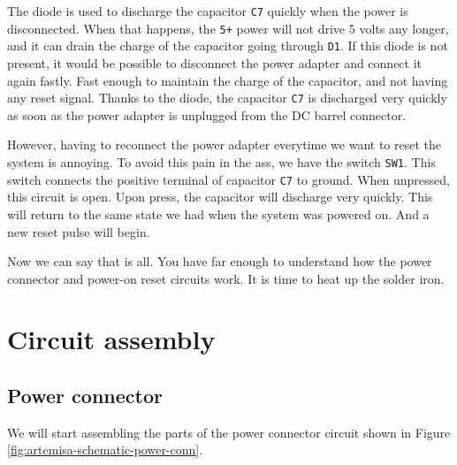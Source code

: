 The diode is used to discharge the capacitor {\tt C7} quickly when the power is disconnected. When that happens, the {\tt 5+} power will not drive 5 volts any longer, and it can drain the charge of the capacitor going through {\tt D1}. If this diode is not present, it would be possible to disconnect the power adapter and connect it again fastly. Fast enough to maintain the charge of the capacitor, and not having any reset signal. Thanks to the diode, the capacitor {\tt C7} is discharged very quickly as soon as the power adapter is unplugged from the DC barrel connector.

However, having to reconnect the power adapter everytime we want to reset the system is annoying. To avoid this pain in the ass, we have the switch {\tt SW1}. This switch connects the positive terminal of capacitor {\tt C7} to ground. When unpressed, this circuit is open. Upon press, the capacitor will discharge very quickly. This will return to the same state we had when the system was powered on. And a new reset pulse will begin.

Now we can say that is all. You have far enough to understand how the power connector and power-on reset circuits work. It is time to heat up the solder iron.

\section{Circuit assembly}

\subsection{Power connector}

We will start assembling the parts of the power connector circuit shown in Figure \ref{fig:artemisa-schematic-power-conn}.

